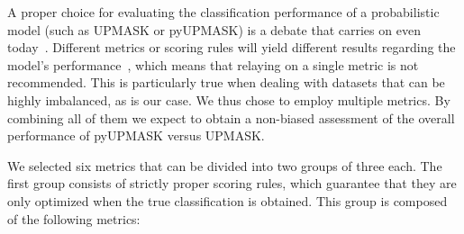 \documentclass{aa}
\begin{document}
 A proper choice for evaluating the classification performance of a
 probabilistic model (such as UPMASK or pyUPMASK) is a debate that carries on
 even today~\citep{Hand_2009,hernandez_2012}. Different metrics or scoring
 rules will yield different results regarding the model's
 performance~\citep{Merkle_2013}, which means that relaying on a single metric
 is not recommended. This is particularly true when dealing with datasets that
 can be highly imbalanced, as is our case. We thus chose to employ multiple
 metrics. By combining all of them we expect to obtain a non-biased
 assessment of the overall performance of pyUPMASK versus UPMASK.

 We selected six metrics that can be divided into two groups of three each.
 The first group consists of strictly proper scoring rules, which
 guarantee that they are only optimized when the true classification is
 obtained. This group is composed of the following metrics:\\

\end{document}
